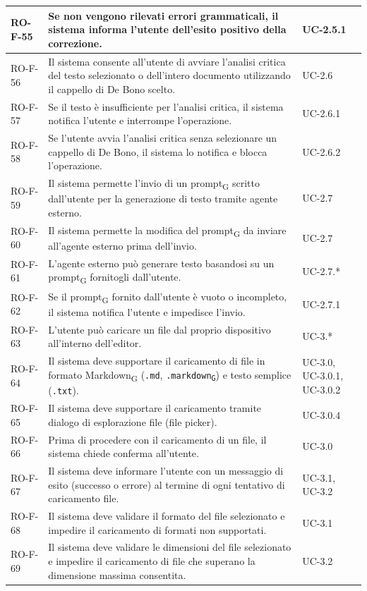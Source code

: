 \documentclass[11pt,a4paper]{article}
\newcommand{\gls}[1]{#1\textsubscript{G}}
\begin{document}
\begin{longtable}{|p{}|>{\raggedright\arraybackslash}p{}|p{}|}
\hline
RO-F-55 & Se non vengono rilevati errori grammaticali, il sistema informa l'utente dell'esito positivo della correzione. & UC-2.5.1 \\
\hline
RO-F-56 & Il sistema consente all'utente di avviare l'analisi critica del testo selezionato o dell'intero documento utilizzando il cappello di De Bono scelto. & UC-2.6 \\
\hline
RO-F-57 & Se il testo è insufficiente per l'analisi critica, il sistema notifica l'utente e interrompe l'operazione. & UC-2.6.1 \\
\hline
RO-F-58 & Se l'utente avvia l'analisi critica senza selezionare un cappello di De Bono, il sistema lo notifica e blocca l'operazione. & UC-2.6.2 \\
\hline
RO-F-59 & Il sistema permette l'invio di un \gls{prompt} scritto dall'utente per la generazione di testo tramite agente esterno. & UC-2.7 \\
\hline
RO-F-60 & Il sistema permette la modifica del \gls{prompt} da inviare all'agente esterno prima dell'invio. & UC-2.7 \\
\hline
RO-F-61 & L'agente esterno può generare testo basandosi su un \gls{prompt} fornitogli dall'utente. & UC-2.7.* \\
\hline
RO-F-62 & Se il \gls{prompt} fornito dall'utente è vuoto o incompleto, il sistema notifica l'utente e impedisce l'invio. & UC-2.7.1 \\
\hline
RO-F-63 & L'utente può caricare un file dal proprio dispositivo all'interno dell'editor. & UC-3.* \\
\hline
RO-F-64 & Il sistema deve supportare il caricamento di file in formato \gls{Markdown} (\texttt{.md}, \texttt{.\gls{markdown}}) e testo semplice (\texttt{.txt}). & UC-3.0, UC-3.0.1, UC-3.0.2 \\
\hline
RO-F-65 & Il sistema deve supportare il caricamento tramite dialogo di esplorazione file (file picker). & UC-3.0.4 \\
\hline
RO-F-66 & Prima di procedere con il caricamento di un file, il sistema chiede conferma all'utente. & UC-3.0 \\
\hline
RO-F-67 & Il sistema deve informare l'utente con un messaggio di esito (successo o errore) al termine di ogni tentativo di caricamento file. & UC-3.1, UC-3.2 \\
\hline
RO-F-68 & Il sistema deve validare il formato del file selezionato e impedire il caricamento di formati non supportati. & UC-3.1 \\
\hline
RO-F-69 & Il sistema deve validare le dimensioni del file selezionato e impedire il caricamento di file che superano la dimensione massima consentita. & UC-3.2 \\

\end{longtable}
\end{document}
